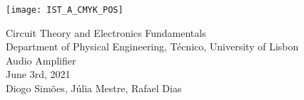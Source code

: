 
\thispagestyle {empty}

\texttt{[image: IST\_A\_CMYK\_POS]}

\begin{center}
%
\vspace{1.0cm}

\vspace{1cm}
{\FontLb Circuit Theory and Electronics Fundamentals} \\ %
\vspace{1cm}
{\FontSn Department of Physical Engineering, Técnico, University of Lisbon} \\ %
\vspace{1cm}
{\FontSn Audio Amplifier } \\
\vspace{1cm}
{\FontSn June 3rd, 2021} \\ %
{\FontSn Diogo Simões, Júlia Mestre, Rafael Dias}
\end{center}

